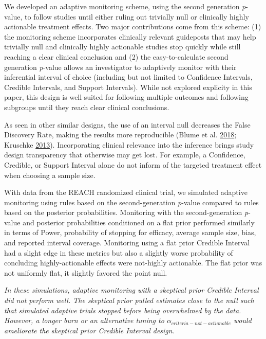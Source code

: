 \documentclass[12pt,oneside]{book}
\newlength{\li}\setlength{\li}{14.48pt}
\newlength{\di}\setlength{\di}{-3.5mm}
\theoremstyle{definition}
\theoremstyle{definition}
\theoremstyle{definition}
\theoremstyle{remark}
\begin{document}
We developed an adaptive monitoring scheme, using the second generation
\emph{p}-value, to follow studies until either ruling out trivially null
or clinically highly actionable treatment effects. Two major
contributions come from this scheme: (1) the monitoring scheme
incorporates clinically relevant guideposts that may help trivially null
and clinically highly actionable studies stop quickly while still
reaching a clear clinical conclusion and (2) the easy-to-calculate
second generation \emph{p}-value allows an investigator to adaptively
monitor with their inferential interval of choice (including but not
limited to Confidence Intervals, Credible Intervals, and Support
Intervals). While not explored explicity in this paper, this design is
well suited for following multiple outcomes and following subgroups
until they reach clear clinical conclusions.

As seen in other similar designs, the use of an interval null decreases
the False Discovery Rate, making the results more reproducible (Blume et
al. \protect\hyperlink{ref-Blume:SGPV}{2018}; Kruschke
\protect\hyperlink{ref-Kruschke:2013jy}{2013}). Incorporating clinical
relevance into the inference brings study design transparency that
otherwise may get lost. For example, a Confidence, Credible, or Support
Interval alone do not inform of the targeted treatment effect when
choosing a sample size.

With data from the REACH randomized clinical trial, we simulated
adaptive monitoring using rules based on the second-generation
\emph{p}-value compared to rules based on the posterior probabilities.
Monitoring with the second-generation \emph{p}-value and posterior
probabilities conditioned on a flat prior performed similarly in terms
of Power, probability of stopping for efficacy, average sample size,
bias, and reported interval coverage. Monitoring using a flat prior
Credible Interval had a slight edge in these metrics but also a slightly
worse probability of concluding highly-actionable effects were
not-highly actionable. The flat prior was not uniformly flat, it
slightly favored the point null.

\emph{In these simulations, adaptive monitoring with a skeptical prior
Credible Interval did not perform well. The skeptical prior pulled
estimates close to the null such that simulated adaptive trials stopped
before being overwhelmed by the data. However, a longer burn or an
alternative tuning to \(\alpha_{criteria-not-actionable}\) would
ameliorate the skeptical prior Credible Interval design.}
\end{document}
